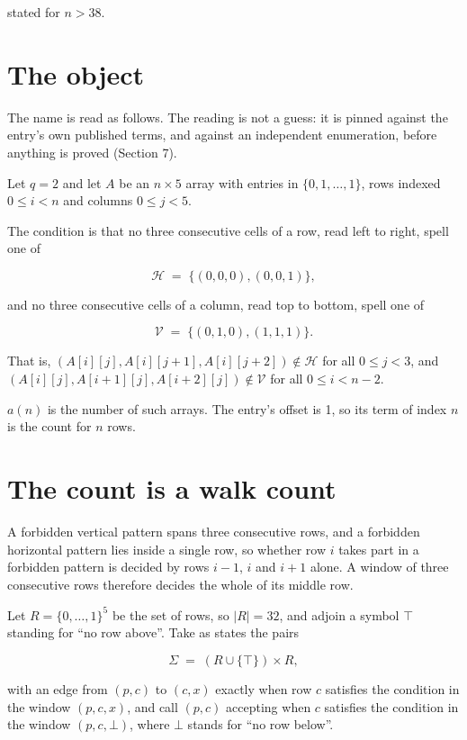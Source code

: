 \documentclass[11pt]{article}
\theoremstyle{definition}
\begin{document}
stated for $n > 38$.

\section{The object}

The name is read as follows. The reading is not a guess: it is pinned against the entry's own published terms, and against an independent enumeration, before anything is proved (Section 7).

Let $q = 2$ and let $A$ be an $n \times 5$ array with entries in $\{0,1,\dots,1\}$, rows indexed $0 \le i < n$ and columns $0 \le j < 5$.

The condition is that no three consecutive cells of a row, read left to right, spell one of

\[\mathcal{H} \;=\; \{(0,0,0), (0,0,1)\},\]

and no three consecutive cells of a column, read top to bottom, spell one of

\[\mathcal{V} \;=\; \{(0,1,0), (1,1,1)\}.\]

That is, $(A[i][j],A[i][j{+}1],A[i][j{+}2]) \notin \mathcal{H}$ for all $0 \le j < 3$, and $(A[i][j],A[i{+}1][j],A[i{+}2][j]) \notin \mathcal{V}$ for all $0 \le i < n-2$.

$a(n)$ is the number of such arrays. The entry's offset is 1, so its term of index $n$ is the count for $n$ rows.

\section{The count is a walk count}

A forbidden vertical pattern spans three consecutive rows, and a forbidden horizontal pattern lies inside a single row, so whether row $i$ takes part in a forbidden pattern is decided by rows $i-1$, $i$ and $i+1$ alone. A window of three consecutive rows therefore decides the whole of its middle row.

Let $R = \{0,\dots,1\}^{5}$ be the set of rows, so $|R| = 32$, and adjoin a symbol $\top$ standing for ``no row above''. Take as states the pairs

\[\Sigma \;=\; (R \cup \{\top\}) \times R,\]

with an edge from $(p,c)$ to $(c,x)$ exactly when row $c$ satisfies the condition in the window $(p,c,x)$, and call $(p,c)$ accepting when $c$ satisfies the condition in the window $(p,c,\bot)$, where $\bot$ stands for ``no row below''.
\end{document}
